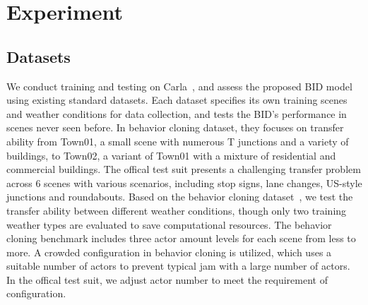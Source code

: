 \documentclass[preprint,12pt]{elsarticle}
\begin{document}



\section{Experiment}
%	

\subsection{Datasets} \label{sec:Dataset}

\hspace{1pc}We conduct training and testing on Carla~\cite{Dosovitskiy:2017},
and assess the proposed BID model using existing standard datasets\cite{codevilla2019exploring}. 
Each dataset specifies its own training scenes and weather conditions for data collection, 
and tests the BID's performance in scenes never seen before. 
In behavior cloning dataset\cite{codevilla2019exploring}, they focuses on transfer ability from Town01, a small scene with numerous T junctions and a variety of buildings, to Town02, a variant of Town01 with a mixture of residential and commercial buildings.
The offical test suit presents a challenging transfer problem across 6 scenes with various scenarios, including stop signs, lane changes, US-style junctions and roundabouts.
Based on the behavior cloning dataset~\cite{codevilla2019exploring}, we test the transfer ability between different weather conditions, though only two training weather types are evaluated to save computational resources. 
The behavior cloning benchmark includes three actor amount levels for each scene from less to more. 
A crowded configuration in behavior cloning is utilized, which uses a suitable number of actors to prevent typical jam with a large number of actors. 
In the offical test suit, we adjust actor number to meet the requirement of configuration. 
\end{document}
